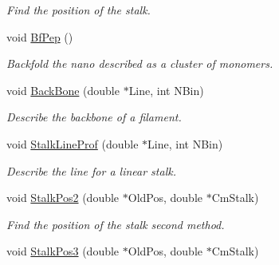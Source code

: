 \begin{DoxyCompactItemize}
\begin{DoxyCompactList}\small\item\em \-Find the position of the stalk. \end{DoxyCompactList}\item 
\hypertarget{classVarData_a71d64d583aa288c4bc45579df741ea07}{void \hyperlink{classVarData_a71d64d583aa288c4bc45579df741ea07}{\-Bf\-Pep} ()}\label{classVarData_a71d64d583aa288c4bc45579df741ea07}

\begin{DoxyCompactList}\small\item\em \-Backfold the nano described as a cluster of monomers. \end{DoxyCompactList}\item 
\hypertarget{classVarData_abe9b658d50575d5d6be580bc87f3b4ac}{void \hyperlink{classVarData_abe9b658d50575d5d6be580bc87f3b4ac}{\-Back\-Bone} (double $\ast$\-Line, int \-N\-Bin)}\label{classVarData_abe9b658d50575d5d6be580bc87f3b4ac}

\begin{DoxyCompactList}\small\item\em \-Describe the backbone of a filament. \end{DoxyCompactList}\item 
\hypertarget{classVarData_af1b41051cede003baf90d8a7bf49ca8d}{void \hyperlink{classVarData_af1b41051cede003baf90d8a7bf49ca8d}{\-Stalk\-Line\-Prof} (double $\ast$\-Line, int \-N\-Bin)}\label{classVarData_af1b41051cede003baf90d8a7bf49ca8d}

\begin{DoxyCompactList}\small\item\em \-Describe the line for a linear stalk. \end{DoxyCompactList}\item 
\hypertarget{classVarData_a27d73648f0e3e381a832e8e9002a3bd6}{void \hyperlink{classVarData_a27d73648f0e3e381a832e8e9002a3bd6}{\-Stalk\-Pos2} (double $\ast$\-Old\-Pos, double $\ast$\-Cm\-Stalk)}\label{classVarData_a27d73648f0e3e381a832e8e9002a3bd6}

\begin{DoxyCompactList}\small\item\em \-Find the position of the stalk second method. \end{DoxyCompactList}\item 
\hypertarget{classVarData_aa2acae864359003a4b752ed363262f14}{void \hyperlink{classVarData_aa2acae864359003a4b752ed363262f14}{\-Stalk\-Pos3} (double $\ast$\-Old\-Pos, double $\ast$\-Cm\-Stalk)}\label{classVarData_aa2acae864359003a4b752ed363262f14}


\end{DoxyCompactItemize}

